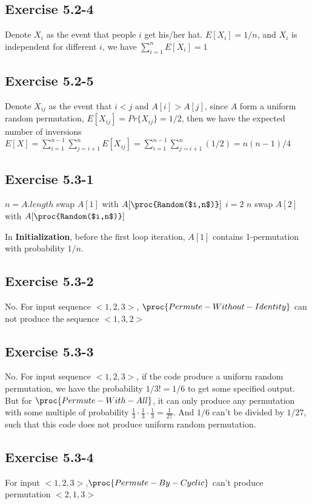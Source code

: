 \documentclass[12pt]{article}
\theoremstyle{definition}
\theoremstyle{remark}
\begin{document}
\subsection*{Exercise 5.2-4}
Denote $X_i$ as the event that people $i$ get his/her hat. $E[X_i]=1/n$, and $X_i$ is independent for different $i$, we have $\sum\limits_{i=1}^{n}E[X_i]=1$
\subsection*{Exercise 5.2-5}
Denote $X_{ij}$ as the event that $i<j$ and $A[i]>A[j]$, since $A$ form a uniform random permutation, $E[X_{ij}]=Pr\{X_{ij}\}=1/2$, then we have the expected number of inversions $E[X]=\sum\limits_{i=1}^{n-1}\sum\limits_{j=i+1}^{n}E[X_{ij}]=\sum\limits_{i=1}^{n-1}\sum\limits_{j=i+1}^{n}(1/2)=n(n-1)/4$
\subsection*{Exercise 5.3-1}
\begin{codebox}
\li $n=A.length$
\li swap $A[1]$ with $A[\proc{Random($i,n$)}]$
\li \For $i=2$ \To $n$
\li \quad swap $A[2]$ with $A[\proc{Random($i,n$)}]$
\end{codebox}
In \textbf{Initialization}, before the first loop iteration, $A[1]$ contains 1-permutation with probability $1/n$.
\subsection*{Exercise 5.3-2}
No. For input sequence $<1,2,3>$, $\proc{Permute-Without-Identity}$ can not produce the sequence $<1,3,2>$
\subsection*{Exercise 5.3-3}
No. For input sequence $<1,2,3>$, if the code produce a uniform random permutation, we have the probability $1/3!=1/6$ to get some specified output. But for $\proc{Permute-With-All}$, it can only produce any permutation with some multiple of probability $\frac{1}{3}\cdot\frac{1}{3}\cdot\frac{1}{3}=\frac{1}{27}$. And $1/6$ can't be divided by $1/27$, such that this code does not produce uniform random permutation.
\subsection*{Exercise 5.3-4}
For input $<1,2,3>$,$\proc{Permute-By-Cyclic}$ can't produce permutation $<2,1,3>$
\end{document}
